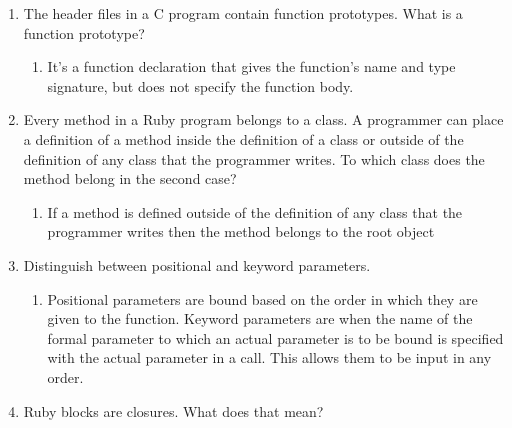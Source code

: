 \begin{enumerate}
\begin{answer}
    \end{answer}

  \item The header files in a C program contain function
    prototypes. What is a function prototype?
    \begin{answer}

    \begin{enumerate}
    \item It's a function declaration that gives the function's name
      and type signature, but does not specify the function body.
    \end{enumerate}

    \end{answer}
  
  \item Every method in a Ruby program belongs to a class.
    A programmer can place a definition of a method inside
    the definition of a class or outside of the definition
    of any class that the programmer writes. To which class
    does the method belong in the second case?

  
    \begin{answer}

    \begin{enumerate}
    \item If a method is defined outside of the definition of any
      class that the programmer writes then the method belongs to the
      root object
    \end{enumerate}

    \end{answer}
  \item Distinguish between positional and keyword parameters.

    \begin{answer}

    \begin{enumerate}
    \item Positional parameters are bound based on the order in which
      they are given to the function. Keyword parameters are when the
      name of the formal parameter to which an actual parameter is to
      be bound is specified with the actual parameter in a call. This
      allows them to be input in any order.
    \end{enumerate}

    \end{answer}
  \item Ruby blocks are closures. What does that mean?


\end{enumerate}
